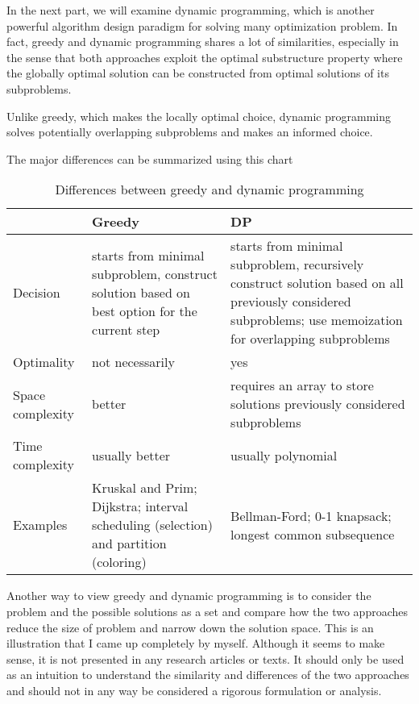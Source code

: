 In the next part, we will examine dynamic programming, which is another powerful algorithm design paradigm for solving many optimization problem. In fact, greedy and dynamic programming shares a lot of similarities, especially in the sense that both approaches exploit the optimal substructure property where the globally optimal solution can be constructed from optimal solutions of its subproblems.

Unlike greedy, which makes the locally optimal choice, dynamic programming solves potentially overlapping subproblems and makes an informed choice.

The major differences can be summarized using this chart

\begin{table}[htbp]
    \centering\begin{tabular}{p{}|p{}|p{}}
        & Greedy & DP \\
        \hline
        Decision & starts from minimal subproblem, construct solution based on best option for the current step & starts from minimal subproblem, recursively construct solution based on all previously considered subproblems; use memoization for overlapping subproblems \\
        \hline
        Optimality & not necessarily & yes \\
        \hline
        Space complexity & better & requires an array to store solutions previously considered subproblems \\
        \hline
        Time complexity & usually better & usually polynomial \\
        \hline
        Examples & Kruskal and Prim; Dijkstra; interval scheduling (selection) and partition (coloring) & Bellman-Ford; 0-1 knapsack; longest common subsequence
    \end{tabular}
    \caption{Differences between greedy and dynamic programming}
    \label{tab:greedy-vs-dp}
\end{table}

Another way to view greedy and dynamic programming is to consider the problem and the possible solutions as a set and compare how the two approaches reduce the size of problem and narrow down the solution space. This is an illustration that I came up completely by myself. Although it seems to make sense, it is not presented in any research articles or texts. It should only be used as an intuition to understand the similarity and differences of the two approaches and should not in any way be considered a rigorous formulation or analysis.

